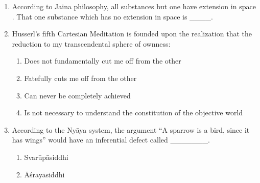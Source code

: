 \documentclass[12pt]{article}
\theoremstyle{remark}
\begin{document}
\begin{enumerate}
\begin{enumerate}
\end{enumerate}
\hfill{}
\item According to Jaina philosophy, all substances  but one have extension in space . That one substance which has no extension in space  is \_\_\_\_.
\begin{enumerate}
\end{enumerate}
\hfill{}
\item Husserl’s fifth Cartesian Meditation is founded upon the realization that the reduction to my transcendental sphere of ownness: 
\begin{enumerate}
    \item Does not fundamentally cut me off from the other
    \item Fatefully cuts me off from the other
    \item Can never be completely achieved
    \item Is not necessary to understand the constitution of the objective world
\end{enumerate}
\hfill{}
\item According to the Ny\={a}ya system, the argument “A sparrow is a bird, since it has wings” would have an inferential defect  called \_\_\_\_\_\_\_.
\begin{enumerate}
    \item Svar\={u}p\={a}siddhi 
    \item \={A}\'{s}ray\={a}siddhi 

\end{enumerate}
\end{enumerate}
\end{document}
